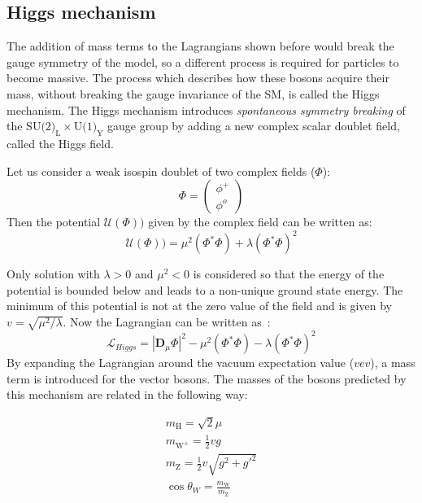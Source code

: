 \subsection{Higgs mechanism}%
\label{sec:theory:standardmodel:higgs}
The addition of mass terms to the Lagrangians shown before would break the gauge symmetry of the model, so a different process is required for particles to become massive. The process which describes how these bosons acquire their mass, without breaking the gauge invariance of the SM, is called the Higgs mechanism. The Higgs mechanism introduces \textit{spontaneous symmetry breaking} of the $\text{SU(2)}_{\text{L}} \times \text{U(1)}_{\text{Y}}$ gauge group by adding a new complex scalar doublet field, called the Higgs field.~\cite{halzen} 

Let us consider a weak isospin doublet of two complex fields ($\Phi$):
\begin{equation}
	\Phi = \begin{pmatrix} \phi^{+} \\ \phi^{o} \end{pmatrix}
\end{equation}
Then the potential $\mathcal{U}(\Phi))$ given by the complex field can be written as:
\begin{equation}
	\mathcal{U}(\Phi)) = \mu^{2}(\Phi^{*}\Phi) + \lambda(\Phi^{*}\Phi)^{2}
\end{equation}

Only solution with $\lambda>0$ and $\mu^{2}<0$ is considered so that the energy of the potential is bounded below and leads to a non-unique ground state energy. The minimum of this potential is not at the zero value of the field and is given by $v = \sqrt{\mu^{2}/\lambda}$. Now the Lagrangian can be written as~\cite{halzen}:
\begin{equation}
	\mathcal{L}_{Higgs} = |\textbf{D}_{\mu}\Phi|^{2} - \mu^{2}(\Phi^{*}\Phi) - \lambda(\Phi^{*}\Phi)^{2}
\end{equation}
By expanding the Lagrangian around the vacuum expectation value ($vev$), a mass term is introduced for the vector bosons. The masses of the bosons predicted by this mechanism are related in the following way:

\begin{align}
	m_{\text{H}} = \sqrt{2}\mu \\
	m_{\text{W}^{\pm}} = \frac{1}{2}vg \\
	m_{\text{Z}} = \frac{1}{2}v\sqrt{g^{2} + g'^{2}} \\
	\cos\theta_{W} = \frac{m_{\text{W}}}{m_{\text{Z}}}
\end{align}

